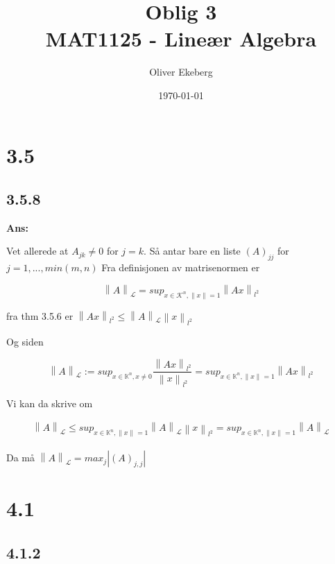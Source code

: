 \documentclass[11pt]{article}
\title{Oblig 3 \\ MAT1125 - Lineær Algebra}
\author{Oliver Ekeberg}
\date{\today}
\newenvironment{solbox}
  {\begin{mdframed}[linewidth=1pt,linecolor=black,roundcorner=5pt]
   \noindent\textbf{Ans: }\enspace}
  {\end{mdframed}}
\newcommand{\norm}[1]{\left \lVert #1 \right \rVert}
\begin{document}
\maketitle


\tableofcontents


\section{3.5}

\subsection{3.5.8}

\begin{solbox}

    Vet allerede at $ A_{jk} \neq 0 $ for $ j=k $. Så antar bare en liste $ \left( A \right) _{jj} $ for $ j=1,..., min(m,n) $ 
    Fra definisjonen av matrisenormen er 

    \[
        \norm{A}_\mathcal{L} = sup_{x \in \mathcal{ K } ^n ,\norm{x}=1} \norm{Ax}_{l^2}
    \]

    fra thm 3.5.6 er $ \norm{Ax}_{l^2} \leq \norm{A}_\mathcal{L}  \norm{x}_{l^2}$
    
    Og siden 

    \[
        \norm{A}_{ \mathcal{L}}^{} := sup_{x \in \mathbb{K}^n, x \neq 0} \frac{ \norm{Ax}_{l^2}^{} }{ \norm{x}_{l^2}^{} } = sup_{x \in \mathbb{K}^n, \norm{x}_{}^{} =1} \norm{Ax}_{l^2}^{} 
    \]
    
    Vi kan da skrive om 

    \begin{align*}
        \norm{A}_{ \mathcal{L}}^{} \leq sup_{x \in \mathbb{K}^n, \norm{x}_{}^{} =1} \norm{A}_{ \mathcal{L}}^{} \norm{x}_{l^2}^{} =  sup_{x \in \mathbb{K}^n, \norm{x}_{}^{} =1} \norm{A}_{ \mathcal{L}}^{}
    \end{align*}

    Da må $ \norm{A}_{ \mathcal{L}}^{}  = max_j \left| \left( A \right)_{j,j}  \right|  $ 
    

\end{solbox}


\section{4.1}

\subsection{4.1.2}
\end{document}
